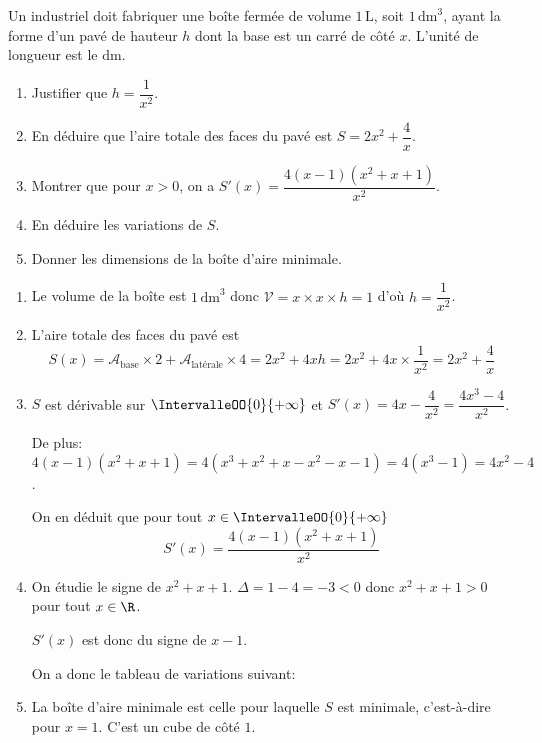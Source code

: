 \documentclass{article}
\begin{document}
Un industriel doit fabriquer une boîte fermée de volume $1\,\text{L}$, soit $1\,\text{dm}^3$, ayant la forme d'un pavé de hauteur $h$ dont la base est un carré de côté $x$. L'unité de longueur est le $\text{dm}$.

\begin{enumerate}
  \item Justifier que $h = \dfrac{1}{x^2}$.
  
  \item En déduire que l'aire totale des faces du pavé est $S = 2x^2 + \dfrac{4}{x}$.
  
  \item Montrer que pour $x > 0$, on a $S'(x) = \dfrac{4(x-1)(x^2+x+1)}{x^2}$.
  
  \item En déduire les variations de $S$.
  
  \item Donner les dimensions de la boîte d'aire minimale.
\end{enumerate}


\begin{enumerate}
  \item Le volume de la boîte est $1\,\text{dm}^3$ donc $\mathcal{V}=x \times x \times h = 1$ d'où $h = \dfrac{1}{x^2}$.
    
    \item L'aire totale des faces du pavé est $$S(x) = \mathcal{A}_{\text{base}}\times 2+\mathcal{A}_{\text{latérale}}\times 4 = 2x^2 + 4xh = 2x^2 + 4x\times \dfrac{1}{x^2} = 2x^2 + \dfrac{4}{x}$$
    
    \item $S$ est dérivable sur $\IntervalleOO{0}{+\infty}$ et $S'(x) = 4x - \dfrac{4}{x^2} = \dfrac{4x^3-4}{x^2}$.
    
    De plus: $4(x-1)(x^2+x+1) = 4(x^3+x^2+x-x^2-x-1) = 4(x^3-1) = 4x^2-4$.

    On en déduit que pour tout $x \in \IntervalleOO{0}{+\infty}$ $$S'(x) = \dfrac{4(x-1)(x^2+x+1)}{x^2}$$

    \item On étudie le signe de $x^2+x+1$. $\Delta = 1-4 = -3 < 0$ donc $x^2+x+1 > 0$ pour tout $x \in \R$.
    
    $S'(x)$ est donc du signe de $x-1$.

    On a donc le tableau de variations suivant:

    \begin{center}
    \end{center}

    \item La boîte d'aire minimale est celle pour laquelle $S$ est minimale, c'est-à-dire pour $x=1$. C'est un cube de côté $1$.
\end{enumerate}
\end{document}
